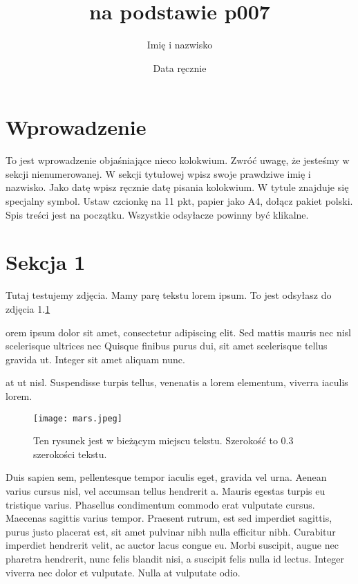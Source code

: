 \documentclass[11pt,a4paper]{article}  %
\title{na podstawie p007}
\author{Imię i nazwisko}
\date{Data ręcznie}
\begin{document}
\maketitle

\tableofcontents %

\section*{Wprowadzenie}
To jest wprowadzenie objaśniające nieco kolokwium. Zwróć uwagę, że jesteśmy w sekcji nienumerowanej. W sekcji tytułowej wpisz swoje prawdziwe
imię i nazwisko. Jako datę wpisz ręcznie datę pisania kolokwium. W tytule znajduje się specjalny symbol. Ustaw czcionkę na 11 pkt, papier jako
A4, dołącz pakiet polski. Spis treści jest na początku. Wszystkie  odsyłacze
powinny być klikalne.
\section{Sekcja 1}
Tutaj testujemy zdjęcia. Mamy parę tekstu lorem ipsum. To jest odsyłasz
do zdjęcia 1.\ref{fot:zdj}

orem ipsum dolor sit amet, consectetur adipiscing elit. Sed mattis mauris nec nisl scelerisque ultrices nec  Quisque finibus purus dui, sit amet scelerisque tellus gravida ut. Integer sit amet aliquam nunc.

 at ut nisl. Suspendisse turpis tellus, venenatis a lorem elementum, viverra iaculis lorem.

\begin{figure}[ht]
\centering
\label{fot:zdj}
        \texttt{[image: mars.jpeg]}
        \caption{ Ten rysunek jest w bieżącym miejscu tekstu. Szerokość to 0.3
szerokości tekstu.}
\end{figure}


Duis sapien sem, pellentesque tempor iaculis eget, gravida vel urna. Aenean varius cursus nisl, vel accumsan tellus hendrerit a. Mauris egestas turpis eu tristique varius. Phasellus condimentum commodo erat vulputate cursus. Maecenas sagittis varius tempor. Praesent rutrum, est sed imperdiet sagittis, purus justo placerat est, sit amet pulvinar nibh nulla efficitur nibh. Curabitur imperdiet hendrerit velit, ac auctor lacus congue eu. Morbi suscipit, augue nec pharetra hendrerit, nunc felis blandit nisi, a suscipit felis nulla id lectus. Integer viverra nec dolor et vulputate. Nulla at vulputate odio.
\end{document}
